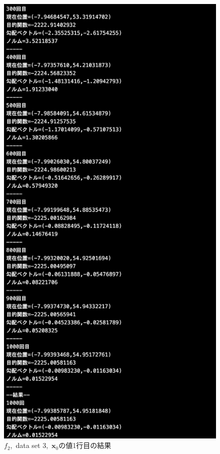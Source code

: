 \documentclass[12pt]{jarticle}
\begin{document}
\begin{figure}[h]
\begin{minipage}{0.5\hsize}
    \end{minipage}
    \begin{minipage}{0.5\hsize}
        \begin{center}
            \includegraphics[scale=0.2]{kadai1_2s_out3_1_3.png}
        \end{center}
    \end{minipage}
    \caption{$f_2$,\ data set 3,\ $\boldsymbol{x}_0$の値1行目の結果}
\end{figure}
\end{document}
